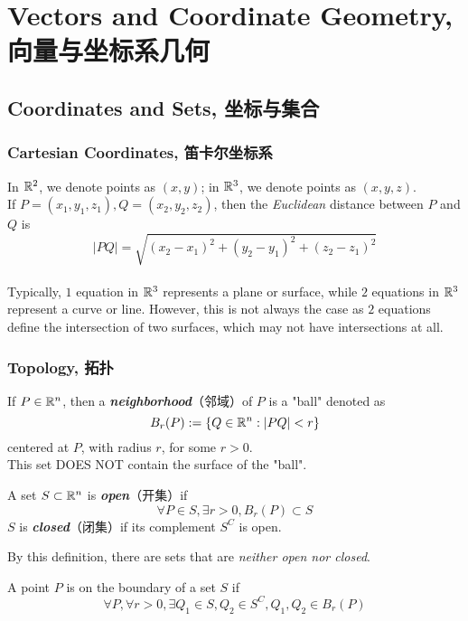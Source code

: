 \section{Vectors and Coordinate Geometry, 向量与坐标系几何}
\subsection{Coordinates and Sets, 坐标与集合}
\subsubsection{Cartesian Coordinates, 笛卡尔坐标系}
In $\mathbb{R}^2$, we denote points as $(x, y)$; in $\mathbb{R}^3$, we denote points as $(x, y, z)$. \\
If $P = (x_1, y_1, z_1), Q = (x_2, y_2, z_2)$, then the \textit{Euclidean} distance between $P$ and $Q$ is
$$|PQ| = \sqrt{(x_2 - x_1)^2 + (y_2 - y_1)^2 + (z_2 - z_1)^2}$$
\\
Typically, $1$ equation in $\mathbb{R}^3$ represents a plane or surface, while $2$ equations in $\mathbb{R}^3$ represent a curve or line. However, this is not always the case as $2$ equations define the intersection of two surfaces, which may not have intersections at all.

\subsubsection{Topology, 拓扑}
\begin{definition}
    If $P \in \mathbb{R}^n$, then a \textbf{\textit{neighborhood}}（邻域）of $P$ is a  "ball" denoted as
    $$B_r(P) := \{Q \in \mathbb{R}^n: |PQ| < r\}$$
    centered at $P$, with radius $r$, for some $r > 0$. \\
    This set DOES NOT contain the surface of the "ball".
\end{definition}
\begin{definition}
    A set $S \subset \mathbb{R}^n$ is \textbf{\textit{open}}（开集）if
    $$\forall P \in S, \exists r > 0, B_r(P) \subset S$$
    $S$ is \textbf{\textit{closed}}（闭集）if its complement $S^C$ is open.
\end{definition}
By this definition, there are sets that are \textit{neither open nor closed}.
\begin{definition}
    A point $P$ is on the boundary of a set $S$ if 
    $$\forall P, \forall r > 0, \exists Q_1 \in S, Q_2 \in S^C, Q_1, Q_2 \in B_r(P)$$
\end{definition}

